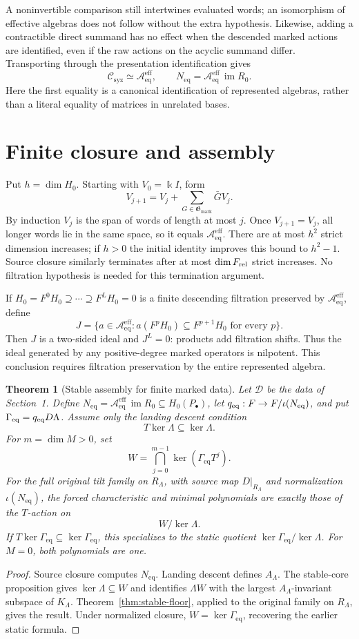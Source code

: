 \documentclass[11pt]{amsart}
\newtheorem{theorem}{Theorem}[section]
\theoremstyle{definition}
\newcommand{\kk}{\Bbbk}
\newcommand{\im}{\operatorname{im}}
\newcommand{\Aeff}{\mathscr A_{\mathrm{eq}}^{\mathrm{eff}}}
\newcommand{\Neq}{N_{\mathrm{eq}}}
\newcommand{\Geq}{\Gamma_{\mathrm{eq}}}
\newcommand{\Gmark}{\mathfrak G_{\mathrm{mark}}}
\newcommand{\Csyz}{\mathscr C_{\mathrm{syz}}}
\begin{document}
A noninvertible comparison still intertwines evaluated words; an isomorphism
of effective algebras does not follow without the extra hypothesis.
Likewise, adding a contractible direct summand has no effect when the descended
marked actions are identified, even if the raw actions on the acyclic summand differ.
Transporting through the presentation identification gives
\[
\Csyz\simeq\Aeff,\qquad \Neq=\Aeff\,\im R_0.
\]
Here the first equality is a canonical identification of represented algebras,
rather than a literal equality of matrices in unrelated bases.

\section{Finite closure and assembly}\label{sec:assembly}

Put \(h=\dim H_0\). Starting with \(V_0=\kk I\), form
\[
V_{j+1}=V_j+\sum_{G\in\Gmark}\bar G V_j.
\]
By induction \(V_j\) is the span of words of length at most \(j\).
Once \(V_{j+1}=V_j\), all longer words lie in the same space, so it equals \(\Aeff\).
There are at most \(h^2\) strict dimension increases; if \(h>0\) the initial
identity improves this bound to \(h^2-1\). Source closure similarly terminates after
at most \(\dim F_{\rm rel}\) strict increases. No filtration hypothesis is needed
for this termination argument.

If \(H_0=F^0H_0\supseteq\cdots\supseteq F^LH_0=0\) is a finite descending filtration
preserved by \(\Aeff\), define
\[
J=\{a\in\Aeff:a(F^pH_0)\subseteq F^{p+1}H_0\text{ for every }p\}.
\]
Then \(J\) is a two-sided ideal and \(J^L=0\): products add filtration shifts.
Thus the ideal generated by any positive-degree marked operators is nilpotent.
This conclusion requires filtration preservation by the entire represented algebra.

\begin{theorem}[Stable assembly for finite marked data]\label{thm:assembly}
Let \(\mathcal D\) be the data of Section~1. Define
\(\Neq=\Aeff\,\im R_0\subseteq H_0(P_\bullet)\),
let \(q_{\rm eq}:F\to F/\iota(\Neq)\), and put \(\Geq=q_{\rm eq}D\Lambda\).
Assume only the landing descent condition
\[
T\ker\Lambda\subseteq\ker\Lambda.
\]
For \(m=\dim M>0\), set
\[
W=\bigcap_{j=0}^{m-1}\ker(\Geq T^j).
\]
For the full original tilt family on \(R_\Lambda\), with source map
\(D|_{R_\Lambda}\) and normalization \(\iota(\Neq)\), the forced
characteristic and minimal polynomials are exactly those of the \(T\)-action on
\[
W/\ker\Lambda.
\]
If \(T\ker\Geq\subseteq\ker\Geq\), this specializes to the static quotient
\(\ker\Geq/\ker\Lambda\). For \(M=0\), both polynomials are one.
\end{theorem}
\begin{proof}
Source closure computes \(\Neq\). Landing descent defines \(A_\Lambda\).
The stable-core proposition gives \(\ker\Lambda\subseteq W\) and identifies
\(\Lambda W\) with the largest \(A_\Lambda\)-invariant subspace of
\(K_\Lambda\). Theorem~\ref{thm:stable-floor}, applied to the original family
on \(R_\Lambda\), gives the result. Under normalized closure,
\(W=\ker\Geq\), recovering the earlier static formula.
\end{proof}
\end{document}
